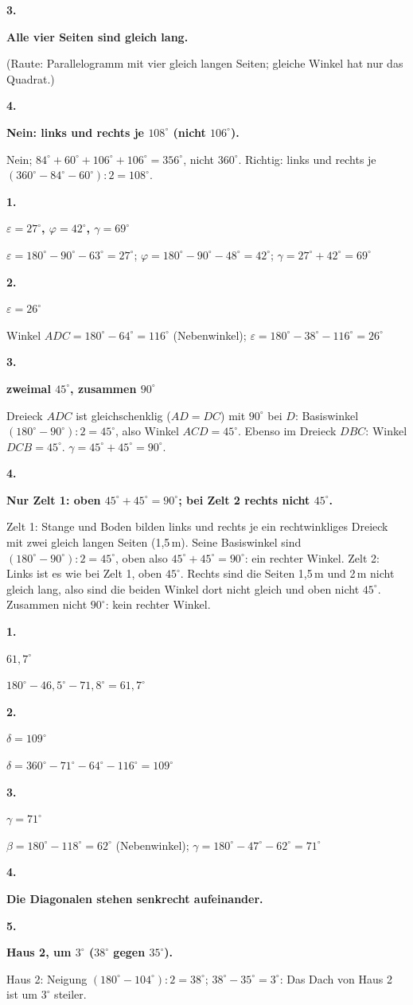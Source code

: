 \documentclass[11pt]{article}
\newcommand{\lsg}[3]{\par\noindent\begin{minipage}[t]{9mm}\textbf{#1}\end{minipage}%
  \begin{minipage}[t]{52mm}\raggedright\bfseries\boldmath #2\end{minipage}\hspace{3mm}%
  \begin{minipage}[t]{\dimexpr\linewidth-64mm\relax}\raggedright\small #3\end{minipage}\par\vspace{4pt}}
\newlength{\kr}
\begin{document}
\lsg{3.}{Alle vier Seiten sind gleich lang.}{(Raute: Parallelogramm mit vier gleich langen Seiten; gleiche Winkel hat nur das Quadrat.)}
\lsg{4.}{Nein: links und rechts je $108^\circ$ (nicht $106^\circ$).}{Nein; $84^\circ + 60^\circ + 106^\circ + 106^\circ = 356^\circ$, nicht $360^\circ$. Richtig: links und rechts je $(360^\circ - 84^\circ - 60^\circ) : 2 = 108^\circ$.}
\par\Needspace{25mm}\vspace{6pt}\noindent\colorbox{black!12}{}\hspace{2mm}{\bfseries Winkel in Teildreiecken}\par\vspace{4pt}
\lsg{1.}{$\varepsilon = 27^\circ$, $\varphi = 42^\circ$, $\gamma = 69^\circ$}{$\varepsilon = 180^\circ - 90^\circ - 63^\circ = 27^\circ$; $\varphi = 180^\circ - 90^\circ - 48^\circ = 42^\circ$; $\gamma = 27^\circ + 42^\circ = 69^\circ$}
\lsg{2.}{$\varepsilon = 26^\circ$}{Winkel $ADC = 180^\circ - 64^\circ = 116^\circ$ (Nebenwinkel); $\varepsilon = 180^\circ - 38^\circ - 116^\circ = 26^\circ$}
\lsg{3.}{zweimal $45^\circ$, zusammen $90^\circ$}{Dreieck $ADC$ ist gleichschenklig ($AD = DC$) mit $90^\circ$ bei $D$: Basiswinkel $(180^\circ - 90^\circ) : 2 = 45^\circ$, also Winkel $ACD = 45^\circ$. Ebenso im Dreieck $DBC$: Winkel $DCB = 45^\circ$. $\gamma = 45^\circ + 45^\circ = 90^\circ$.}
\lsg{4.}{Nur Zelt 1: oben $45^\circ + 45^\circ = 90^\circ$; bei Zelt 2 rechts nicht $45^\circ$.}{Zelt 1: Stange und Boden bilden links und rechts je ein rechtwinkliges Dreieck mit zwei gleich langen Seiten (1,5\,m). Seine Basiswinkel sind $(180^\circ - 90^\circ) : 2 = 45^\circ$, oben also $45^\circ + 45^\circ = 90^\circ$: ein rechter Winkel. Zelt 2: Links ist es wie bei Zelt 1, oben $45^\circ$. Rechts sind die Seiten 1,5\,m und 2\,m nicht gleich lang, also sind die beiden Winkel dort nicht gleich und oben nicht $45^\circ$. Zusammen nicht $90^\circ$: kein rechter Winkel.}
\par\Needspace{25mm}\vspace{6pt}\noindent\colorbox{black!12}{}\hspace{2mm}{\bfseries Probetest}\par\vspace{4pt}
\lsg{1.}{$61{,}7^\circ$}{$180^\circ - 46{,}5^\circ - 71{,}8^\circ = 61{,}7^\circ$}
\lsg{2.}{$\delta = 109^\circ$}{$\delta = 360^\circ - 71^\circ - 64^\circ - 116^\circ = 109^\circ$}
\lsg{3.}{$\gamma = 71^\circ$}{$\beta = 180^\circ - 118^\circ = 62^\circ$ (Nebenwinkel); $\gamma = 180^\circ - 47^\circ - 62^\circ = 71^\circ$}
\lsg{4.}{Die Diagonalen stehen senkrecht aufeinander.}{}
\lsg{5.}{Haus 2, um $3^\circ$ ($38^\circ$ gegen $35^\circ$).}{Haus 2: Neigung $(180^\circ - 104^\circ) : 2 = 38^\circ$; $38^\circ - 35^\circ = 3^\circ$: Das Dach von Haus 2 ist um $3^\circ$ steiler.}
\end{document}
